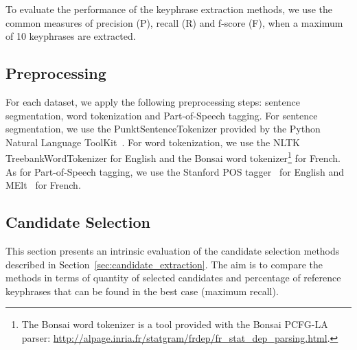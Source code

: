     To evaluate the performance of the keyphrase extraction methods, we use
    the common measures of precision (P), recall (R) and f-score (F), when a
    maximum of 10 keyphrases are extracted.

  \subsection{Preprocessing}
  \label{subsec:preprocessing}
    For each dataset, we apply the following preprocessing steps: sentence
    segmentation, word tokenization and Part-of-Speech tagging. For sentence
    segmentation, we use the PunktSentenceTokenizer provided by the Python
    Natural Language ToolKit~\cite[NLTK]{bird2009nltk}. For word tokenization,
    we use the NLTK TreebankWordTokenizer for English and the Bonsai word
    tokenizer\footnote{The Bonsai word tokenizer is a tool provided with the
    Bonsai PCFG-LA parser:
    \url{http://alpage.inria.fr/statgram/frdep/fr_stat_dep_parsing.html}.} for
    French. As for Part-of-Speech tagging, we use the Stanford
    POS tagger~\cite{toutanova2003stanfordpostagger} for English and
    MElt~\cite{denis2009melt} for French.

  \subsection{Candidate Selection}
  \label{subsec:candidate_extraction}

    This section presents an intrinsic evaluation of the candidate selection
    methods described in Section~\ref{sec:candidate_extraction}. The aim is to
    compare the methods in terms of quantity of selected candidates and
    percentage of reference keyphrases that can be found in the best case
    (maximum recall).

